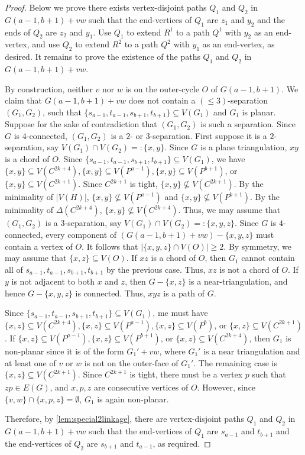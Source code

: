 \documentclass[a4paper,11pt]{article}
\theoremstyle{plain}
\theoremstyle{definition}
\renewcommand{\geq}{\geqslant}
\renewcommand{\leq}{\leqslant}
\begin{document}
\begin{proof}
Below we prove there exists vertex-disjoint paths $Q_1$ and $Q_2$ in $G(a-1,b+1) +vw$ such that the end-vertices of $Q_1$ are $z_1$ and $y_2$ and the ends of $Q_2$ are $z_2$ and $y_1$. Use $Q_1$ to extend $R^1$ to a path $Q^1$ with $y_2$ as an end-vertex, and use $Q_2$ to extend $R^2$ to a path $Q^2$ with $y_1$ as an end-vertex, as desired. It remains to prove the existence of the paths $Q_1$ and $Q_2$ in $G(a-1, b+1)+vw$. 

By construction, neither $v$ nor $w$ is on the outer-cycle $O$ of $G(a-1,b+1)$.  We claim that $G(a-1, b+1)+vw$ does not contain a $(\leq 3)$-separation $(G_1, G_2)$, such that $\{s_{a-1}, t_{a-1}, s_{b+1}, t_{b+1}\} \subseteq V(G_1)$ and $G_1$ is planar.  Suppose for the sake of contradiction that $(G_1, G_2)$ is such a separation.  Since $G$ is $4$-connected, $(G_1, G_2)$ is a $2$- or $3$-separation.  First suppose it is a $2$-separation, say $V(G_1) \cap V(G_2)=:\{x,y\}$.  Since $G$ is a plane triangulation, $xy$ is a chord of $O$. Since $\{s_{a-1}, t_{a-1}, s_{b+1}, t_{b+1}\} \subseteq V(G_1)$, we have $\{x,y\} \subseteq V(C^{2k+4}), \{x,y\} \subseteq V(P^{a-1}), \{x,y\} \subseteq V(P^{b+1})$, or $\{x,y\} \subseteq V(C^{2k+1})$.  Since $C^{2k+1}$ is tight, $\{x,y\} \not\subseteq V(C^{2k+1})$.  By the minimality of $|V(H)|$, $\{x,y\} \not \subseteq V(P^{a-1})$ and $\{x,y\} \not \subseteq V(P^{b+1})$.  By the minimality of $\Delta(C^{2k+4})$, $\{x,y\} \not \subseteq V(C^{2k+4})$.
Thus, we may assume that $(G_1, G_2)$ is a $3$-separation, say $V(G_1) \cap V(G_2)=:\{x,y,z\}$.  Since $G$ is $4$-connected, every component of $(G(a-1, b+1)+vw)-\{x,y,z\}$ must contain a vertex of $O$.  It follows that $|\{x,y,z\} \cap V(O)| \geq 2$.  By symmetry, we may assume that $\{x,z\} \subseteq V(O)$.  If $xz$ is a chord of $O$, then $G_1$ cannot contain all of $s_{a-1}, t_{a-1}, s_{b+1}, t_{b+1}$ by the previous case. Thus, $xz$ is not a chord of $O$.  If $y$ is not adjacent to both $x$ and $z$, then $G-\{x,z\}$ is a near-triangulation, and hence $G-\{x,y,z\}$ is connected.   Thus, $xyz$ is a path of $G$.  


Since $\{s_{a-1}, t_{a-1}, s_{b+1}, t_{b+1}\} \subseteq V(G_1)$, me must have $\{x,z\} \subseteq V(C^{2k+4}), \{x,z\} \subseteq V(P^{a-1}), \{x,z\} \subseteq V(P^b)$, or $\{x,z\} \subseteq V(C^{2k+1})$.  
If $\{x,z\} \subseteq V(P^{a-1}), \{x,z\} \subseteq V(P^{b+1})$, or $\{x,z\} \subseteq V(C^{2k+4})$, then $G_1$ is non-planar since it is of the form $G_1'+vw$, where $G_1'$ is a near triangulation and at least one of $v$ or $w$ is not on the outer-face of $G_1'$.  
The remaining case is $\{x,z\} \subseteq V(C^{2k+1})$.  Since $C^{2k+1}$ is tight, there must be a vertex $p $ such that $zp \in E(G)$, and $x,p,z$ are consecutive vertices of $O$.  However, since $\{v,w\} \cap \{x,p,z\}=\emptyset$, $G_1$ is again non-planar. 

Therefore, by \cref{lem:special2linkage}, there are vertex-disjoint paths $Q_1$ and $Q_2$ in $G(a-1,b+1) +vw$ such that the end-vertices of $Q_1$ are $s_{a-1}$ and $t_{b+1}$ and the end-vertices of $Q_2$ are $s_{b+1}$ and $t_{a-1}$, as required.
\end{proof}
\end{document}
